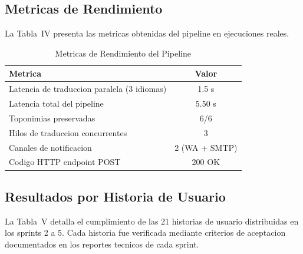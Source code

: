 \documentclass[10pt,twocolumn,a4paper]{article}
\begin{document}
\subsection{Metricas de Rendimiento}

La Tabla~IV presenta las metricas obtenidas del pipeline en
ejecuciones reales.

\begin{table}[t]
\caption{Metricas de Rendimiento del Pipeline}
\label{tab:metricas}
\centering
\small
\begin{tabular}{p{3.5cm}|c}
\hline
\textbf{Metrica} & \textbf{Valor} \\
\hline
Latencia de traduccion paralela (3 idiomas) & 1.5 s \\
Latencia total del pipeline & 5.50 s \\
Toponimias preservadas & 6/6 \\
Hilos de traduccion concurrentes & 3 \\
Canales de notificacion & 2 (WA + SMTP) \\
Codigo HTTP endpoint POST & 200 OK \\
\hline
\end{tabular}
\end{table}

\subsection{Resultados por Historia de Usuario}

La Tabla~V detalla el cumplimiento de las 21 historias de usuario
distribuidas en los sprints 2 a 5. Cada historia fue verificada
mediante criterios de aceptacion documentados en los reportes
tecnicos de cada sprint.
\end{document}

